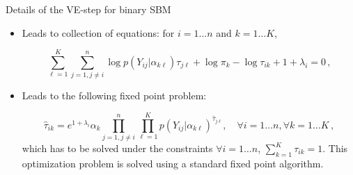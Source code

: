 \documentclass[compress,10pt]{beamer}
\begin{document}
\begin{frame}[allowframebreaks]{Details of the VE-step for binary SBM}
\begin{itemize}
 
 
\item Leads  to collection of equations:  for $i=1\dots n$ and $k=1\dots K$,

 \begin{equation}
  \nonumber
 \sum_{\ell=1}^K \sum_{j=1, j\neq i}^n  \log p(Y_{ij} | \alpha_{k\ell})\tau_{j\ell}   +   \log\pi_{k}  -   \log \tau_{ik} +1 + \lambda_i=0\,,
 \end{equation}
 
 \item Leads to the following fixed point problem:

 \begin{equation}
  \nonumber
  \widehat{\tau}_{ik} = e^{1+ \lambda_i} \alpha_k \prod_{j=1, j\neq i}^n \prod_{\ell=1}^K p(Y_{ij} | \alpha_{k\ell}) ^{\widehat{\tau}_{j\ell}}, \quad \forall  i =1 \dots n,  \forall  k=1 \dots K\,,
 \end{equation}
 which has to be solved under the constraints $\forall i =1 \dots n$, $\sum_{k=1}^K \tau_{ik}=1$. This optimization  problem is solved using a  standard fixed point algorithm.

 \end{itemize}
 
 \end{frame}
 
\end{document}
